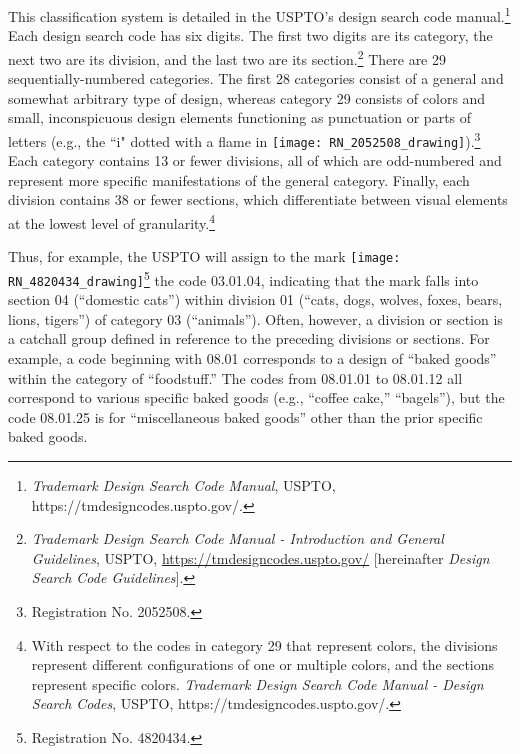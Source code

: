 \documentclass[letterpaper, 11pt, oneside]{article}
\begin{document}
This classification system is detailed in the USPTO's design search code manual.\footnote{\textit{Trademark Design Search Code Manual}, USPTO, https://tmdesigncodes.uspto.gov/.} Each design search code has six digits. The first two digits are its category, the next two are its division, and the last two are its section.\footnote{\label{supra15} \textit{Trademark Design Search Code Manual - Introduction and General Guidelines}, USPTO, \url{https://tmdesigncodes.uspto.gov/} [hereinafter \textit{Design Search Code Guidelines}].} There are 29 sequentially-numbered categories. The first 28 categories consist of a general and somewhat arbitrary type of design, whereas category 29 consists of colors and small, inconspicuous design elements functioning as punctuation or parts of letters (e.g., the ``i" dotted with a flame in \texttt{[image: RN\_2052508\_drawing]}).\footnote{Registration No. 2052508.} Each category contains 13 or fewer divisions, all of which are odd-numbered and represent more specific manifestations of the general category. Finally, each division contains 38 or fewer sections, which differentiate between visual elements at the lowest level of granularity.\footnote{With respect to the codes in category 29 that represent colors, the divisions represent different configurations of one or multiple colors, and the sections represent specific colors. \textit{Trademark Design Search Code Manual - Design Search Codes}, USPTO, https://tmdesigncodes.uspto.gov/.}

Thus, for example, the USPTO will assign to the mark \texttt{[image: RN\_4820434\_drawing]}\footnote{Registration No. 4820434.} the code 03.01.04, indicating that the mark falls into section 04 (``domestic cats'') within division 01 (``cats, dogs, wolves, foxes, bears, lions, tigers'') of category 03 (``animals''). Often, however, a division or section is a catchall group defined in reference to the preceding divisions or sections. For example, a code beginning with 08.01 corresponds to a design of ``baked goods'' within the category of ``foodstuff.'' The codes from 08.01.01 to 08.01.12 all correspond to various specific baked goods (e.g., ``coffee cake,'' ``bagels''), but the code 08.01.25 is for ``miscellaneous baked goods'' other than the prior specific baked goods.
\end{document}
